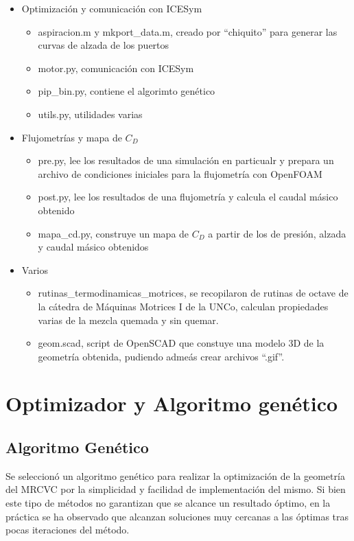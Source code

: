 \begin{itemize}
  \item Optimización y comunicación con ICESym
  \begin{itemize}
    \item aspiracion.m y mkport\_data.m, creado por ``chiquito'' para generar
      las curvas de alzada de los puertos
    \item motor.py, comunicación con ICESym
    \item pip\_bin.py, contiene el algorimto genético
    \item utils.py, utilidades varias
  \end{itemize}
  \item Flujometrías y mapa de $C_D$
  \begin{itemize}
    \item pre.py, lee los resultados de una simulación en particualr y prepara
      un archivo de condiciones iniciales para la flujometría con OpenFOAM
    \item post.py, lee los resultados de una flujometría y calcula el caudal
      másico obtenido
    \item mapa\_cd.py, construye un mapa de $C_D$ a partir de los de presión,
      alzada y caudal másico obtenidos
  \end{itemize}
  \item{Varios}
  \begin{itemize}
    \item rutinas\_termodinamicas\_motrices, se recopilaron de rutinas de octave
      de la cátedra de Máquinas Motrices I de la UNCo, calculan propiedades
      varias de la mezcla quemada y sin quemar.
    \item geom.scad, script de OpenSCAD que constuye una modelo 3D de la
      geometría obtenida, pudiendo admeás crear archivos ``.gif''.
  \end{itemize}
\end{itemize}



\section{Optimizador y Algoritmo genético}
%
\subsection{Algoritmo Genético}
%
Se seleccionó un algoritmo genético para realizar la optimización de la
geometría del MRCVC por la simplicidad y facilidad de implementación del mismo.
%
Si bien este tipo de métodos no garantizan que se alcance un resultado óptimo,
en la práctica\cite{goldberg}\cite{shi} se ha observado que alcanzan soluciones
muy cercanas a las óptimas tras pocas iteraciones del método.

